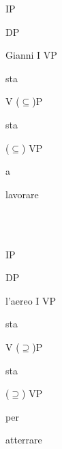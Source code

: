 \documentclass[output=paper]{langsci/langscibook}
\begin{document}
                                    IP

                  DP 

             Gianni          I                       VP

                                sta

                                            V                         (${\subseteq}$)P

                                           sta

                                                           (${\subseteq}$)                    VP

                                                             a                    

                                                                                 lavorare

\ea%
    \label{ex:key:26}
    \gll\\
        \\
    \glt
    \z

                                    IP

                  DP 

             l’aereo          I                       VP

                                 sta

                                            V                         (${\supseteq}$)P

                                           sta

                                                           (${\supseteq}$)                    VP

                                                           per                    

                                                                                 atterrare
\end{document}
